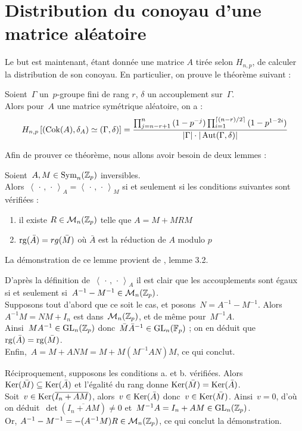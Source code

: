 \section{Distribution du conoyau d'une matrice aléatoire}

Le but est maintenant, étant donnée une matrice $A$ tirée selon $H_{n,p}$, de calculer la distribution de son conoyau.
En particulier, on prouve le théorème suivant :

\begin{thm}
Soient~$\Gamma$ un~$p$-groupe fini de rang $r$, $\delta$ un accouplement sur~$\Gamma$.\\
Alors pour~$A$ une matrice symétrique aléatoire, on a :
\[ H_{n,p}\left[(\operatorname{Cok}(A),\delta_A) \simeq (\Gamma,\delta)\right] = \frac{\prod_{j=n-r+1}^{n}{(1-p^{-j})}\prod_{i=1}^{\lceil (n-r)/2\rceil}{(1-p^{1-2i})}}{|\Gamma|\cdot|\operatorname{Aut}(\Gamma,\delta)|}\]
\end{thm} 

Afin de prouver ce théorème, nous allons avoir besoin de deux lemmes :

\begin{lem}
Soient~$A,M\in\operatorname{Sym}_n(\mathbb{Z}_p)$ inversibles.\\ Alors~$\left<\,\cdot\,,\,\cdot\,\right>_{\!A} = \left<\,\cdot\,,\,\cdot\,\right>_{\!M}$ si et seulement si les conditions suivantes sont vérifiées :
\begin{enumerate}
\item il existe $R\in\mathcal M_n(\mathbb{Z}_p)$ telle que $A=M+MRM$
\item $\operatorname{rg}(\bar A) = rg(\bar M)$ où $\bar A$ est la réduction de $A$ modulo $p$
\end{enumerate}
\end{lem}

La démonstration de ce lemme provient de \cite{lemma}, lemme 3.2.
\begin{dem} D'après la définition de~$\left<\,\cdot\,,\,\cdot\,\right>_{\!A}$ il est clair que les accouplements sont égaux si et seulement si~$A^{-1} - M^{-1} \in \mathcal{M}_n(\mathbb{Z}_p)$.\\
Supposons tout d'abord que ce soit le cas, et posons~$N = A^{-1} - M^{-1}$. Alors~$A^{-1}M = NM+I_n$ est dans~$\mathcal M_n(\mathbb{Z}_p)$, et de même pour~$M^{-1}A$. \\
Ainsi~$MA^{-1}\in \operatorname{GL}_n(\mathbb{Z}_p)$ donc~$\bar M\bar A^{-1}\in \operatorname{GL}_n(\mathbb F_p)$ ; on en déduit que~$\operatorname{rg}(\bar A) = \operatorname{rg}(\bar M)$.\\
Enfin,~$A = M+ANM = M + M(M^{-1}AN)M$, ce qui conclut.

Réciproquement, supposons les conditions a. et b. vérifiées. Alors~$\operatorname{Ker}(\bar M) \subseteq \operatorname{Ker}(\bar A)$ et l'égalité du rang donne $\operatorname{Ker}(\bar M) = \operatorname{Ker}(\bar A)$.\\
Soit~$v\in\operatorname{Ker}(\overline{I_n+AM})$, alors~$v\in\operatorname{Ker}(\bar A)$ donc~$v\in\operatorname{Ker}(\bar M)$. Ainsi~$v = 0$, d'où on déduit~$\det(\overline{I_n+AM})\neq 0$ et~$M^{-1}A = I_n+AM \in\operatorname{GL}_n(\mathbb{Z}_p)$.\\
Or, $A^{-1}-M^{-1} = -(A^{-1}M)R \in\mathcal M_n(\mathbb{Z}_p)$,  ce qui conclut la démonstration.
\end{dem}

